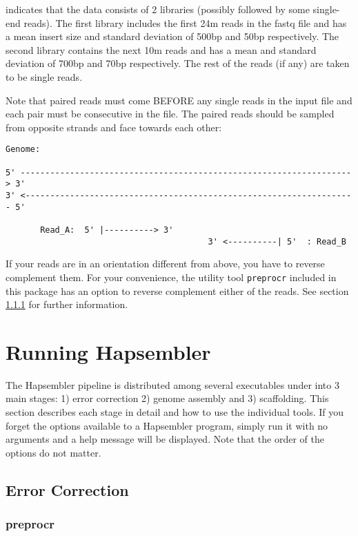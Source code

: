 \documentclass[12pt,a4paper]{report}
\begin{document}
indicates that the data consists of 2 libraries (possibly followed by some single-end reads). The first library includes the first 24m reads in the fastq file and has a mean insert size and standard deviation of 500bp and 50bp respectively. The second library contains the next 10m reads and has a mean and standard deviation of 700bp and 70bp respectively. The rest of the reads (if any) are taken to be single reads. 

Note that paired reads must come BEFORE any single reads in the input file and each pair must be consecutive in the file. The paired reads should be sampled from opposite strands and face towards each other:

\begin{verbatim}
Genome:

5' -------------------------------------------------------------------> 3'
3' <------------------------------------------------------------------- 5'

       Read_A:  5' |----------> 3'
                                         3' <----------| 5'  : Read_B
\end{verbatim}

If your reads are in an orientation different from above, you have to reverse complement them. For your convenience, the utility tool \texttt{preprocr} included in this package has an option to reverse complement either of the reads. See section \ref{utils} for further information.

\section{Running Hapsembler}

The Hapsembler pipeline is distributed among several executables under into 3 main stages: 1) error correction 2) genome assembly and 3) scaffolding. This section describes each stage in detail and how to use the individual tools. If you forget the options available to a Hapsembler program, simply run it with no arguments and a help message will be displayed. Note that the order of the options do not matter.

\subsection{Error Correction}

\subsubsection{preprocr}
\label{utils}
\end{document}
